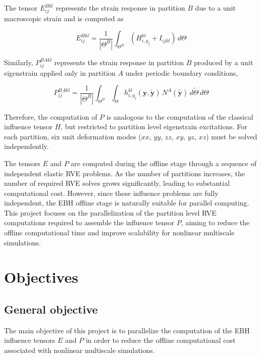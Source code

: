 \documentclass[12pt]{article}
\begin{document}
The tensor $E^{Bkl}_{ij}$ represents the strain response in partition $B$ due to a unit macroscopic strain and is computed as

\begin{equation}
E^{Bkl}_{ij}=\frac{1}{|\Theta^B|}\int_{\Theta^B}\left(H^{kl}_{i,y_j}+I_{ijkl}\right)\,d\Theta
\end{equation}

Similarly, $P^{BAkl}_{ij}$ represents the strain response in partition $B$ produced by a unit eigenstrain applied only in partition $A$ under periodic boundary conditions,

\begin{equation}
P^{BAkl}_{ij}=\frac{1}{|\Theta^B|}\int_{\Theta^B}\int_{\Theta}h^{kl}_{i,y_j}(\mathbf{y},\tilde{\mathbf{y}})\,N^A(\tilde{\mathbf{y}})\,d\tilde{\Theta}\,d\Theta
\end{equation}

Therefore, the computation of $P$ is analogous to the computation of the classical influence tensor $H$, but restricted to partition level eigenstrain excitations. For each partition, six unit deformation modes ($xx$, $yy$, $zz$, $xy$, $yz$, $xz$) must be solved independently.

The tensors $E$ and $P$ are computed during the offline stage through a sequence of independent elastic RVE problems. As the number of partitions increases, the number of required RVE solves grows significantly, leading to substantial computational cost. However, since these influence problems are fully independent, the EBH offline stage is naturally suitable for parallel computing. This project focuses on the parallelization of the partition level RVE computations required to assemble the influence tensor $P$, aiming to reduce the offline computational time and improve scalability for nonlinear multiscale simulations.

\section{Objectives}

\subsection{General objective}

The main objective of this project is to parallelize the computation of the EBH influence tensors $E$ and $P$ in order to reduce the offline computational cost associated with nonlinear multiscale simulations.
\end{document}
